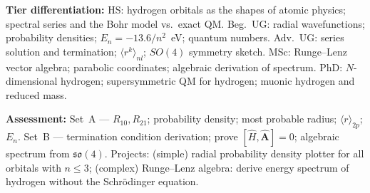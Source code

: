 \documentclass[11pt,a4paper]{article}
\begin{document}
\begin{tcolorbox}[modulebox, title={Module~I.4 / L09: The Hydrogen Atom}]
\medskip\textbf{Tier differentiation:}
HS: hydrogen orbitals as the shapes of atomic physics; spectral series and the Bohr model vs.\ exact QM.
Beg.\ UG: radial wavefunctions; probability densities; $E_n=-13.6/n^2$~eV; quantum numbers.
Adv.\ UG: series solution and termination; $\langle r^k\rangle_{nl}$; $SO(4)$ symmetry sketch.
MSc: Runge--Lenz vector algebra; parabolic coordinates; algebraic derivation of spectrum.
PhD: $N$-dimensional hydrogen; supersymmetric QM for hydrogen; muonic hydrogen and reduced mass.

\medskip\textbf{Assessment:}
Set~A --- $R_{10},R_{21}$; probability density; most probable radius; $\langle r\rangle_{2p}$; $E_n$.
Set~B --- termination condition derivation; prove $[\hat{H},\hat{\mathbf{A}}]=0$; algebraic spectrum from $\mathfrak{so}(4)$.
Projects: (simple) radial probability density plotter for all orbitals with $n\leq3$;
(complex) Runge--Lenz algebra: derive energy spectrum of hydrogen without the Schr\"odinger equation.
\end{tcolorbox}

\medskip
\end{document}
